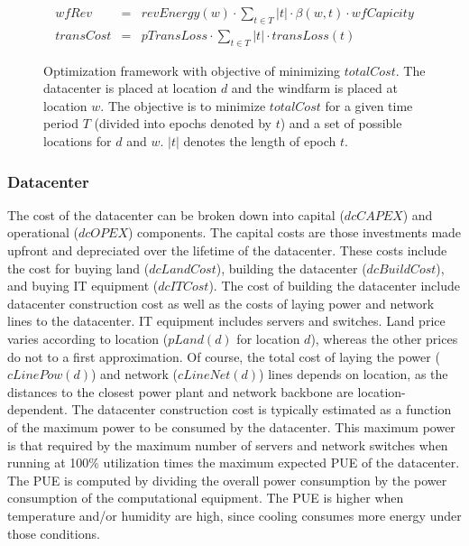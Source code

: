 \begin{figure}
\begin{scriptsize}
\begin{eqnarray}
         \textit{wfRev}&=& \textit{revEnergy}(w) \cdot  \sum_{t \in T}{ |t| \cdot
            \beta(w,t) \cdot  \textit{wfCapicity} } \\
         \textit{transCost}&=& \textit{pTransLoss} \cdot \sum_{t \in T}{ |t| \cdot  \textit{transLoss}(t)} %
\end{eqnarray}
\end{scriptsize}
\caption{Optimization framework with objective of minimizing $totalCost$.  The datacenter is placed at location $d$ and the windfarm is placed at location $w$.  The objective is to minimize $totalCost$ for a given time period $T$ (divided into epochs denoted by $t$) and a set of possible locations for $d$ and $w$.  $|t|$ denotes the length of epoch $t$.}
\label{fig:optimization}
\vspace{-0.2in}
\end{figure}




\subsubsection{Datacenter} The cost of the datacenter can be broken down into capital ($dcCAPEX$) and operational ($dcOPEX$) components.  The capital costs are those investments made upfront and depreciated over the lifetime of the datacenter.  These costs include the cost for buying land ($dcLandCost$), building the datacenter ($dcBuildCost$), and buying IT equipment ($dcITCost$).  The cost of building the datacenter include datacenter construction cost as well as the costs of laying power and network lines to the datacenter.  IT equipment includes servers and switches.  Land price varies according to location ($pLand(d)$ for location $d$), whereas the other prices do not to a first approximation.  Of course, the total cost of laying the power ($cLinePow(d)$) and network ($cLineNet(d)$) lines depends on location, as the distances to the closest power plant and network backbone are location-dependent.  The datacenter construction cost is typically estimated as a function of the maximum power to be consumed by the datacenter.  This maximum power is that required by the maximum number of servers and network switches when running at 100\% utilization times the maximum expected PUE of the datacenter.  The PUE is computed by dividing the overall power consumption by the power consumption of the computational equipment.  The PUE is higher when temperature and/or humidity are high, since cooling consumes more energy under those conditions.

